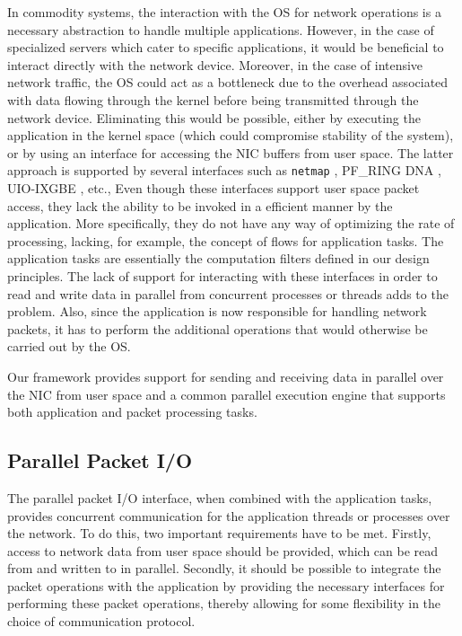 \documentclass[10pt, conference, compsocconf, reqno]{IEEEtran}
\newcommand{\comment}[1]{}
\begin{document}
\comment{Most extant stream applications depend on the OS for their communication tasks.}In commodity systems, the interaction with the OS for network operations is a necessary abstraction to handle multiple applications. However, in the case of specialized servers which cater to specific applications, it would be beneficial to interact directly with the network device. Moreover, in the case of intensive network traffic, the OS could act as a bottleneck due to the overhead associated with data flowing through the kernel before being transmitted through the network device\cite{Wu:2007:PPB:1323954.1323957}\cite{Wu:2007:PAL:1227865.1228021}. Eliminating this would be possible, either by executing the application in the kernel space (which could compromise stability of the system), or by using an interface for accessing the NIC buffers from user space. The latter approach is supported by several interfaces such as \texttt{netmap} \cite{Rizzo:2012:RNI:2090147.2103536}, PF\_RING DNA \cite{1564468}, UIO-IXGBE \cite{Krasnyansky}, etc., Even though these interfaces support user space packet access, they lack the ability to be invoked in a efficient manner by the application. More specifically, they do not have any way of optimizing the rate of processing, lacking, for example, the concept of flows for application tasks. The application tasks are essentially the computation filters defined in our design principles. The lack of support for interacting with these interfaces in order to read and write data in parallel from concurrent processes or threads adds to the problem. Also, since the application is now responsible for handling network packets, it has to perform the additional operations that would otherwise be carried out by the OS.

Our framework provides support for sending and receiving data in parallel over the NIC from user space and a common parallel execution engine that supports both application and packet processing tasks.

\subsection{Parallel Packet I/O}
\label{ppio}
The parallel packet I/O interface, when combined with the application tasks, provides concurrent communication for the application threads or processes over the network. To do this, two important requirements have to be met. Firstly, access to network data from user space should be provided, which can be read from and written to in parallel. Secondly, it should be possible to integrate the packet operations with the application by providing the necessary interfaces for performing these packet operations, thereby allowing for some flexibility in the choice of communication protocol.
\end{document}
